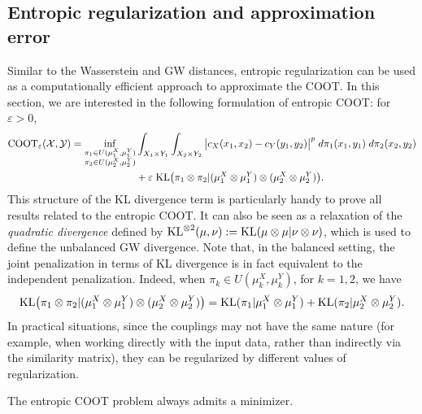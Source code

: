 \subsection{Entropic regularization and approximation error}
Similar to the Wasserstein and GW distances, entropic regularization can be used as a computationally
efficient approach to approximate the COOT. In this section,
we are interested in the following formulation of entropic COOT: for $\varepsilon > 0$,
\begin{align*}
  \text{COOT}_{\varepsilon} (\mathcal X, \mathcal Y) =
  \inf_{\substack{\pi_1 \in U(\mu^X_1, \mu^Y_1) \\
  \pi_2 \in U(\mu^X_2, \mu^Y_2)}} &\int_{X_1 \times Y_1} \int_{X_2 \times Y_2}
  \big\vert c_X(x_1, x_2) - c_Y(y_1, y_2) \big\vert^p \; d\pi_1(x_1, y_1) \; d\pi_2(x_2, y_2) \\
  &+ \varepsilon \; \text{KL} \big( \pi_1 \otimes \pi_2 \vert (\mu^X_1 \otimes \mu^Y_1) \otimes (\mu^X_2 \otimes \mu^Y_2) \big).
\end{align*}
This structure of the KL divergence term is particularly handy to prove all results related to
the entropic COOT. It can also be seen as a relaxation of the \textit{quadratic divergence}
\citep{Sejourne20} defined by $\text{KL}^{\otimes 2}(\mu, \nu):= \text{KL}(\mu \otimes \mu | \nu \otimes \nu)$,
which is used to define the unbalanced GW divergence. Note that, in the balanced setting,
the joint penalization in terms of KL divergence is in fact equivalent to the
independent penalization. Indeed, when $\pi_k \in U(\mu_k^X, \mu_k^Y)$, for $k=1,2$, we have
\begin{equation}
  \text{KL} \big( \pi_1 \otimes \pi_2 \vert (\mu^X_1 \otimes \mu^Y_1) \otimes (\mu^X_2 \otimes \mu^Y_2) \big)
  = \text{KL}(\pi_1 \vert \mu^X_1 \otimes \mu^Y_1) + \text{KL}(\pi_2 \vert \mu^X_2 \otimes \mu^Y_2).
\end{equation}
In practical situations, since the couplings may not have the same nature (for example,
when working directly with the input data, rather than indirectly via the similarity matrix),
they can be regularized by different values of regularization.

\begin{proposition}
The entropic COOT problem always admits a minimizer.
\end{proposition}

